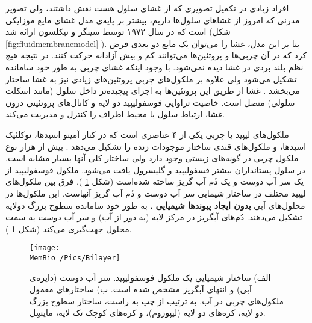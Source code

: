 افراد زیادی در تکمیل تصویری که از غشای سلول هست نقش داشتند، ولی تصویر مدرنی که امروز از غشاهای سلول‌ها داریم، بیشتر بر پایه‌ی مدل غشای مایع موزایکی‌
 است که در سال ۱۹۷۲ توسط سینگر
  و نیکلسون
 ارائه شد
\cite{Singer1972}
(شکل 
\ref{fig:fluidmembranemodel}
). بنا بر این مدل، غشا را می‌توان یک مایع دو بعدی فرض کرد که در آن چربی‌ها و پروتئین‌ها می‌توانند کم و بیش آزادانه حرکت کنند. در نتیجه هیچ نظم بلند بردی در غشا دیده نمی‌شود. با وجود اینکه غشای چربی به طور خود سامانده تشکیل می‌شود ولی علاوه بر ملکول‌های چربی پروتئین‌های زیادی نیز به غشا ساختار می‌بخشد
\cite{wikiCellMembrane}
. غشا از طریق این پروتئین‌ها به اجزای پیچیده‌تر داخل سلول (مانند اسکلت سلولی) متصل است. خاصیت تراوایی فوسفولیپید دو لایه و کانال‌های پروتئینی درون غشا، ارتباط سلول با محیط اطراف را کنترل و مدیریت می‌کند. 







 
 
 
ملکول‌های لیپید یا چربی یکی از ۴ عناصری است که در کنار آمینو اسید‌ها، نوکلئیک اسید‌ها، و ملکول‌های قندی ساختار موجودات زنده را تشکیل می‌دهد
\cite{Membraneasamatteroffat}
.  بیش از هزار نوع ملکول چربی در گونه‌های زیستی وجود دارد ولی ساختار کلی آنها بسیار مشابه است. در سلول‌ پستانداران بیشتر فسفولیپید و گلیسرول یافت می‌شود. ملکول‌ فوسفولیپید از یک سر آب دوست
 و یک دُم آب گریز
 ساخته شده‌است (شکل
\ref{fig:bilayer}
). فرق بین ملکول‌های لیپید مختلف در ساختار شیمایی سر آب دوست و دُم آب‌ گریز آنهاست. این ملکول‌ها در محلول‌های آبی
\textbf{بدون ایجاد پیوندها شیمیایی}
، به طور خود سامانده
 سطوح بزرگ دولایه تشکیل می‌دهند.  دُم‌های  آبگریز در مرکز لایه (به دور از آب) و سر آب دوست به سمت محلول جهت‌گیری می‌کند (شکل
\ref{fig:bilayer}
 ).
\begin{figure}[h]
\begin{center}
\texttt{[image: \\MemBio /Pics/Bilayer]}
\caption{
الف) ساختار شیمیایی یک ملکول فوسفولیپید. سر آب دوست (دایره‌ی آبی) و  انتهای آبگریز مشخص شده است. ب) ساختار‌های معمول ملکول‌های چربی در آب. به ترتیب از چپ به راست، ساختار سطوح بزرگ دو لایه، کره‌های دو لایه (لیپوزوم)، و کره‌های کوچک تک لایه، مایسِل.
}
\label{fig:bilayer}
\end{center}
\end{figure}

